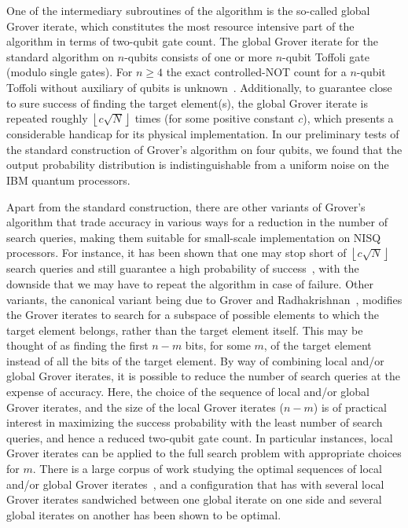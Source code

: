 \bigskip
\noindent
One of the intermediary subroutines of the algorithm is the so-called global Grover iterate, which constitutes the most resource intensive part of the algorithm in terms of two-qubit gate count. The global Grover iterate for the standard algorithm on $n$-qubits consists of one or more $n$-qubit Toffoli gate (modulo single gates). For $n\geq 4$ the exact controlled-NOT count for a $n$-qubit Toffoli without auxiliary of qubits is unknown~\cite{Shende_2008}. Additionally, to guarantee close to sure success of finding the target element(s), the global Grover iterate is repeated roughly $\left\lfloor {c\sqrt{N}} \right\rfloor$ times (for some positive constant $c$), which presents a considerable handicap for its physical implementation. In our preliminary tests of the standard construction of Grover's algorithm on four qubits, we found that the output probability distribution is indistinguishable from a uniform noise on the IBM quantum processors.

\bigskip
\noindent
Apart from the standard construction, there are other variants of Grover's algorithm that trade accuracy in various ways for a reduction in the number of search queries, making them suitable for small-scale implementation on \acs{NISQ} processors. For instance, it has been shown that one may stop short of $\left\lfloor {c\sqrt{N}} \right\rfloor$ search queries and still guarantee a high probability of success~\cite{Boyer_1998}, with the downside that we may have to repeat the algorithm in case of failure. Other variants, the canonical variant being due to Grover and Radhakrishnan~\cite{Grover_2005, Korepin_2006a}, modifies the Grover iterates to search for a subspace of possible elements to which the target element belongs, rather than the target element itself. This may be thought of as finding the first $n-m$ bits, for some $m$, of the target element instead of all the bits of the target element. By way of combining local and/or global Grover iterates, it is possible to reduce the number of search queries at the expense of accuracy. Here, the choice of the sequence of local and/or global Grover iterates, and the size of the local Grover iterates ($n-m$) is of practical interest in maximizing the success probability with the least number of search queries, and hence a reduced two-qubit gate count. In particular instances, local Grover iterates can be applied to the full search problem with appropriate choices for $m$. There is a large corpus of work studying the optimal sequences of local and/or global Grover iterates~\cite{Korepin_2005,Korepin_2006,Choi_2006,Korepin_2006a,Korepin_2006b}, and a configuration that has with several local Grover iterates sandwiched between one global iterate on one side and several global iterates on another has been shown to be optimal. 

